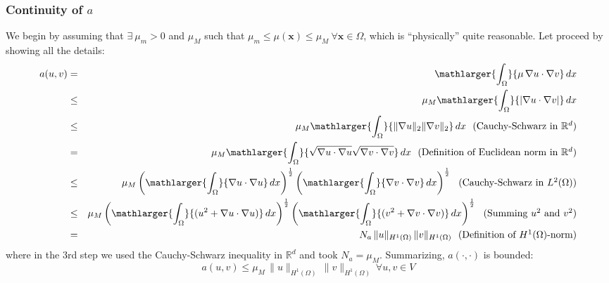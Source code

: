 \subsubsection{Continuity of $a$}

We begin by assuming that $\exists~\mu_m > 0$ and $\mu_M$ such that
$\mu_m \le \mu(\mathbf{x}) \le \mu_M~\forall \mathbf{x} \in \Omega$,
which is ``physically'' quite reasonable.
Let proceed by showing all the details:
\begin{eqnarray*}
a(u,v) & = & \mathlarger{\int_{\Omega}}{\mu\,\nabla{u}\cdot \nabla{v}}\,dx \\
       & \le & \mu_M \mathlarger{\int_{\Omega}}{|\nabla{u}\cdot \nabla{v}|}\,dx \\
       & \le & \mu_M \mathlarger{\int_{\Omega}}{\lVert\nabla{u}\rVert_2 \lVert \nabla{v}\rVert_2}\,dx~~\mbox{(Cauchy-Schwarz in $\mathbb{R}^d$)}  \\
       &  = & \mu_M \mathlarger{\int_{\Omega}}{\sqrt{\nabla{u}\cdot\nabla{u}} \sqrt{\nabla{v}\cdot\nabla{v}}}\,dx~~\mbox{(Definition of Euclidean norm in $\mathbb{R}^d$)}  \\
       & \le & \mu_M \left (\mathlarger{\int_{\Omega}}{\nabla{u}\cdot\nabla{u}}\,dx\right)^{\frac12} \left(\mathlarger{\int_{\Omega}}{\nabla{v}\cdot\nabla{v}}\,dx\right )^{\frac12}~~\mbox{(Cauchy-Schwarz in $L^2(\Omega)$)}  \\
       & \le & \mu_M \left (\mathlarger{\int_{\Omega}}{(u^2+\nabla{u}\cdot\nabla{u})}\,dx\right)^{\frac12} \left(\mathlarger{\int_{\Omega}}{(v^2+\nabla{v}\cdot\nabla{v})}\,dx\right )^{\frac12}~~\mbox{(Summing $u^2$ and $v^2$)}  \\
       & = &  N_a \,\lVert u \rVert_{H^1(\Omega)} \, \lVert v \rVert_{H^1(\Omega)}~~\mbox{(Definition of $H^1(\Omega)$-norm)}  \\
\end{eqnarray*} 
where in the 3rd step we used the Cauchy-Schwarz inequality in $\mathbb{R}^d$
and took $N_a = \mu_M$. Summarizing, $a(\cdot,\cdot)$ is bounded:
\begin{equation}
a(u,v) \le \mu_M \,\lVert u \rVert_{H^1(\Omega)} \, \lVert v \rVert_{H^1(\Omega)}~\forall u,v \in V
\end{equation}

